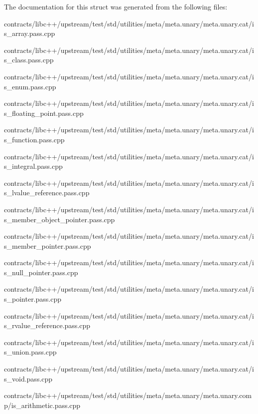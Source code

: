 The documentation for this struct was generated from the following files\+:\begin{DoxyCompactItemize}
\item 
contracts/libc++/upstream/test/std/utilities/meta/meta.\+unary/meta.\+unary.\+cat/is\+\_\+array.\+pass.\+cpp\item 
contracts/libc++/upstream/test/std/utilities/meta/meta.\+unary/meta.\+unary.\+cat/is\+\_\+class.\+pass.\+cpp\item 
contracts/libc++/upstream/test/std/utilities/meta/meta.\+unary/meta.\+unary.\+cat/is\+\_\+enum.\+pass.\+cpp\item 
contracts/libc++/upstream/test/std/utilities/meta/meta.\+unary/meta.\+unary.\+cat/is\+\_\+floating\+\_\+point.\+pass.\+cpp\item 
contracts/libc++/upstream/test/std/utilities/meta/meta.\+unary/meta.\+unary.\+cat/is\+\_\+function.\+pass.\+cpp\item 
contracts/libc++/upstream/test/std/utilities/meta/meta.\+unary/meta.\+unary.\+cat/is\+\_\+integral.\+pass.\+cpp\item 
contracts/libc++/upstream/test/std/utilities/meta/meta.\+unary/meta.\+unary.\+cat/is\+\_\+lvalue\+\_\+reference.\+pass.\+cpp\item 
contracts/libc++/upstream/test/std/utilities/meta/meta.\+unary/meta.\+unary.\+cat/is\+\_\+member\+\_\+object\+\_\+pointer.\+pass.\+cpp\item 
contracts/libc++/upstream/test/std/utilities/meta/meta.\+unary/meta.\+unary.\+cat/is\+\_\+member\+\_\+pointer.\+pass.\+cpp\item 
contracts/libc++/upstream/test/std/utilities/meta/meta.\+unary/meta.\+unary.\+cat/is\+\_\+null\+\_\+pointer.\+pass.\+cpp\item 
contracts/libc++/upstream/test/std/utilities/meta/meta.\+unary/meta.\+unary.\+cat/is\+\_\+pointer.\+pass.\+cpp\item 
contracts/libc++/upstream/test/std/utilities/meta/meta.\+unary/meta.\+unary.\+cat/is\+\_\+rvalue\+\_\+reference.\+pass.\+cpp\item 
contracts/libc++/upstream/test/std/utilities/meta/meta.\+unary/meta.\+unary.\+cat/is\+\_\+union.\+pass.\+cpp\item 
contracts/libc++/upstream/test/std/utilities/meta/meta.\+unary/meta.\+unary.\+cat/is\+\_\+void.\+pass.\+cpp\item 
contracts/libc++/upstream/test/std/utilities/meta/meta.\+unary/meta.\+unary.\+comp/is\+\_\+arithmetic.\+pass.\+cpp\item 

\end{DoxyCompactItemize}
